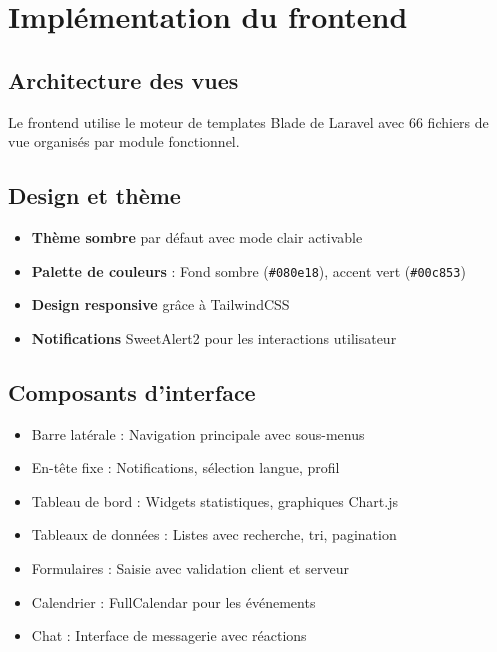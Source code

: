 \documentclass[12pt,a4paper,twoside]{report}
\begin{document}
\section{Implémentation du frontend}

\subsection{Architecture des vues}

Le frontend utilise le moteur de templates Blade de Laravel avec 66 fichiers de vue organisés par module fonctionnel.

\subsection{Design et thème}

\begin{itemize}
    \item \textbf{Thème sombre} par défaut avec mode clair activable
    \item \textbf{Palette de couleurs} : Fond sombre (\texttt{\#080e18}), accent vert (\texttt{\#00c853})
    \item \textbf{Design responsive} grâce à TailwindCSS
    \item \textbf{Notifications} SweetAlert2 pour les interactions utilisateur
\end{itemize}

\subsection{Composants d'interface}

\begin{itemize}
    \item Barre latérale : Navigation principale avec sous-menus
    \item En-tête fixe : Notifications, sélection langue, profil
    \item Tableau de bord : Widgets statistiques, graphiques Chart.js
    \item Tableaux de données : Listes avec recherche, tri, pagination
    \item Formulaires : Saisie avec validation client et serveur
    \item Calendrier : FullCalendar pour les événements
    \item Chat : Interface de messagerie avec réactions
\end{itemize}
\end{document}
